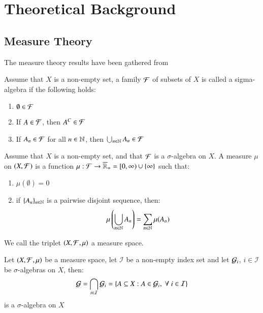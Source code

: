 \chapter{Theoretical Background}
\label{chp_theoretical_background}


\section{Measure Theory}
The measure theory results have been gathered from \cite{lindstrom2017}

\begin{definition}
Assume that $X$ is a non-empty set, a family $\mathcal{F}$ of subsets of $X$ is called a sigma-algebra if the following holds: 
\begin{enumerate}[label= (\roman*), leftmargin=*]
  \item $\emptyset \in \mathcal{F}$
  \item If $A\in \mathcal{F}$, then $A^{C}\in \mathcal{F}$ 
  \item If $A_{n} \in \mathcal{F}$ for all $n\in \mathbb{N}$, then $\bigcup_{n\in \mathbb{N}}A_{n}\in \mathcal{F}$
\end{enumerate}
\end{definition}

\begin{definition}
Assume that $X$ is a non-empty set, and that $\mathcal{F}$ is a $\sigma$-algebra on $X$. 
A measure $\mu$ on $(X,\mathcal{F})$ is a function $\mu:\mathcal{F}\to \overline{\mathbb{R}}_{+} =[0,\infty)\cup \{\infty\}$
such that: 
\begin{enumerate}[label = (\roman*), leftmargin=*]
    \item $\mu(\emptyset) = 0$ 
    \item if $\{A_{n}\}_{n\in \mathbb{N}}$ is a pairwise disjoint sequence, then: 
    \[\mu\left(\bigcup_{n\in \mathbb{N}}A_{n}\right) = \sum_{n\in \mathbb{N}}\mu(A_{n})\]
\end{enumerate}
We call the triplet $(X,\mathcal{F},\mu)$ a measure space.
\end{definition}

\begin{proposition}
Let $(X,\mathcal{F}, \mu)$ be a measure space, let $\mathcal{I}$ be a non-empty index set and let $\mathcal{G}_{i}$, $i\in \mathcal{I}$ be $\sigma$-algebras on $X$, then: 
\[\mathcal{G} = \bigcap_{i \in \mathcal{I}}\mathcal{G}_{i} = \{A\subseteq X: A\in \mathcal{G}_{i},\; \forall\; i\in \mathcal{I}\}
\] 
is a $\sigma$-algebra on $X$
\end{proposition}

